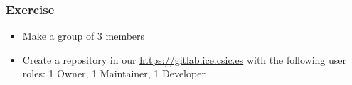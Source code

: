 \begin{frame}

\frametitle{Exercise}

\begin{itemize}[<+->]
\item Make a group of 3 members
\item Create a repository in our \href{Gitlab}{https://gitlab.ice.csic.es} with the following user roles: 1 Owner, 1 Maintainer, 1 Developer  
\end{itemize}

\end{frame}